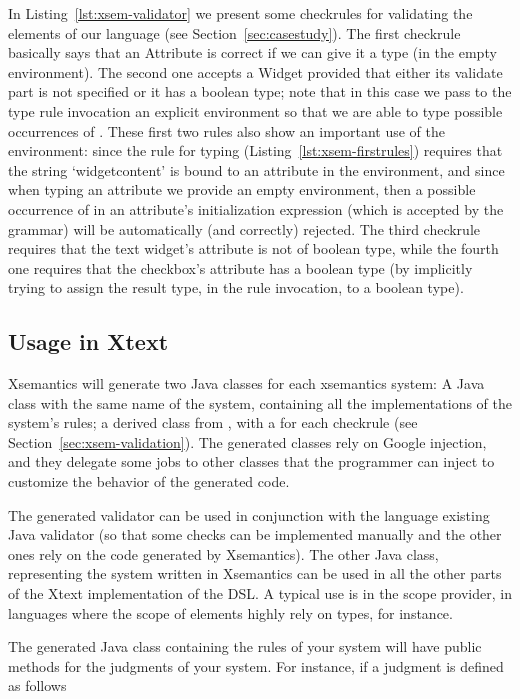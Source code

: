 In Listing~\ref{lst:xsem-validator} we present some checkrules for validating
the elements of our language (see Section~\ref{sec:casestudy}).  The first
checkrule basically says that an Attribute is correct if we can give it a type
(in the empty environment).  The second one accepts a Widget provided that
either its validate part is not specified or it has a boolean type; note that in
this case we pass to the type rule invocation an explicit environment so that we
are able to type possible occurrences of .  These first two
rules also show an important use of the environment: since the rule for typing
 (Listing~\ref{lst:xsem-firstrules}) requires that the
string `widgetcontent' is bound to an attribute in the environment, and since when typing an attribute we provide an
empty environment, then a possible occurrence of  in an
attribute's initialization expression (which is accepted by the grammar) will be
automatically (and correctly) rejected.
The third checkrule requires that the text widget's attribute is not of boolean
type, while the fourth one requires that the checkbox's attribute has a boolean
type (by implicitly trying to assign the result type, in the rule invocation, to
a boolean type).
\subsection{Usage in Xtext}

Xsemantics will generate two Java classes for each xsemantics system:
A Java class with the same name of the system, containing all the
implementations of the system's rules; a derived class from
, with a \checkm{} for each checkrule (see
Section~\ref{sec:xsem-validation}).
The generated classes rely on Google injection, and they delegate some jobs to
other classes that the programmer can inject to customize the behavior of the
generated code.

The generated validator can be used in conjunction with the language existing
Java validator (so that some checks can be implemented manually and the other
ones rely on the code generated by Xsemantics).  The other Java class,
representing the system written in Xsemantics can be used in all the other parts
of the Xtext implementation of the DSL.  A typical use is in the scope provider,
in languages where the scope of elements highly rely on types, for instance.

The generated Java class containing the rules of your system will have
public methods for the judgments of your system.  For instance, if a judgment is
defined as follows


